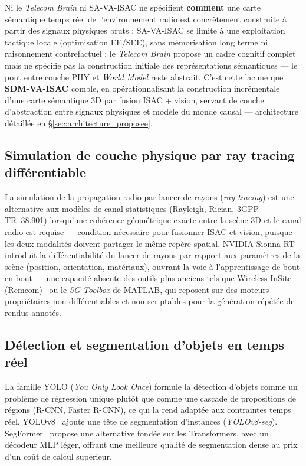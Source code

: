 \documentclass[12pt,a4paper,titlepage]{article}
\begin{document}
Ni le \textit{Telecom Brain} ni SA-VA-ISAC ne spécifient \textbf{comment} une carte sémantique temps réel de l'environnement radio est concrètement construite à partir des signaux physiques bruts : SA-VA-ISAC se limite à une exploitation tactique locale (optimisation EE/SEE), sans mémorisation long terme ni raisonnement contrefactuel ; le \textit{Telecom Brain} propose un cadre cognitif complet mais ne spécifie pas la construction initiale des représentations sémantiques --- le pont entre couche PHY et \textit{World Model} reste abstrait. C'est cette lacune que \textbf{SDM-VA-ISAC} comble, en opérationnalisant la construction incrémentale d'une carte sémantique 3D par fusion ISAC + vision, servant de couche d'abstraction entre signaux physiques et modèle du monde causal --- architecture détaillée en \S\ref{sec:architecture_proposee}.

\subsection{Simulation de couche physique par ray tracing différentiable}
\label{subsec:art_rt}

La simulation de la propagation radio par lancer de rayons (\textit{ray tracing}) est une alternative aux modèles de canal statistiques (Rayleigh, Rician, 3GPP TR~38.901) lorsqu'une cohérence géométrique exacte entre la scène 3D et le canal radio est requise --- condition nécessaire pour fusionner ISAC et vision, puisque les deux modalités doivent partager le même repère spatial. NVIDIA Sionna RT~\cite{sionna_rt_2} introduit la différentiabilité du lancer de rayons par rapport aux paramètres de la scène (position, orientation, matériaux), ouvrant la voie à l'apprentissage de bout en bout --- une capacité absente des outils plus anciens tels que Wireless InSite (Remcom)~\cite{remcom_wi} ou le \textit{5G Toolbox} de MATLAB, qui reposent sur des moteurs propriétaires non différentiables et non scriptables pour la génération répétée de rendus annotés.

\subsection{Détection et segmentation d'objets en temps réel}
\label{subsec:art_detection}

La famille YOLO (\textit{You Only Look Once}) formule la détection d'objets comme un problème de régression unique plutôt que comme une cascade de propositions de régions (R-CNN, Faster R-CNN), ce qui la rend adaptée aux contraintes temps réel. YOLOv8~\cite{ultralytics_yolov8} ajoute une tête de segmentation d'instances (\textit{YOLOv8-seg}). SegFormer~\cite{segformer} propose une alternative fondée sur les Transformers, avec un décodeur MLP léger, offrant une meilleure qualité de segmentation dense au prix d'un coût de calcul supérieur.
\end{document}
